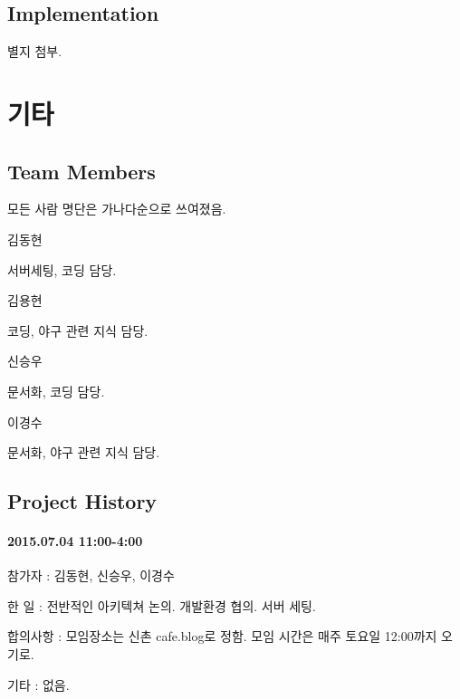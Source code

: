 \documentclass[twoside]{article}
\begin{document}
\subsection{Implementation}

별지 첨부. 

\section{기타}

\subsection{Team Members}

모든 사람 명단은 가나다순으로 쓰여졌음. 

\begin{compactitem}
\item 김동현

서버세팅, 코딩 담당. 
\item 김용현

코딩, 야구 관련 지식 담당. 
\item 신승우 

문서화, 코딩 담당. 
\item 이경수 

문서화, 야구 관련 지식 담당. 
\end{compactitem}

\subsection{Project History}


\paragraph{\textbf{2015.07.04 11:00-4:00}}

\begin{compactitem}
\item 참가자 : 김동현, 신승우, 이경수
\item 한 일 : 전반적인 아키텍쳐 논의. 개발환경 협의. 서버 세팅.
\item 합의사항 : 모임장소는 신촌 cafe.blog로 정함. 모임 시간은 매주 토요일 12:00까지 오기로. 
\item 기타 : 없음. 
\end{compactitem}
\end{document}

